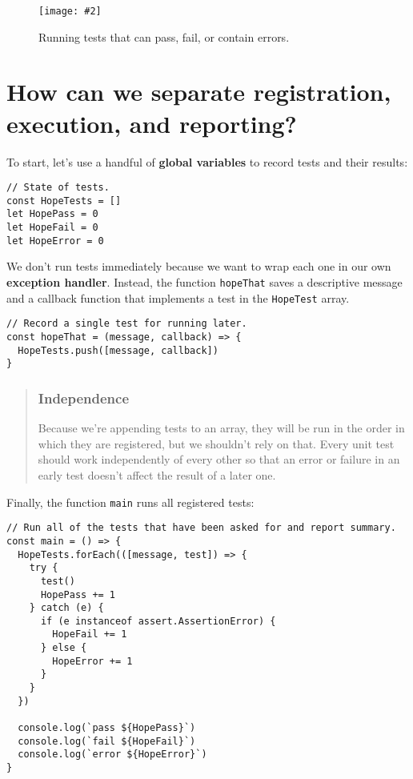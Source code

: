 \documentclass[krantzl]{krantz}
\newcommand{\figpdf}[4]{\begin{figure}%
\centering%
\texttt{[image: \#2]}%
\caption{#3}%
\label{#1}%
\end{figure}}
\newcommand{\glossref}[1]{\textbf{#1}}
\newenvironment{callout}{\savenotes\begin{tBox}\begin{quotation}\toggletrue{inbox}\renewcommand{\thempfootnote}{\arabic{footnote}}}{\end{quotation}\vspace{\baselineskip}\end{tBox}\togglefalse{inbox}\spewnotes}
\begin{document}
\figpdf{unit-test-mental-model}{./unit-test/mental-model.pdf}{Running tests that can pass, fail, or contain errors.}{0.6}

\section{How can we separate registration, execution, and reporting?}\label{unit-test-design}


To start,
let’s use a handful of \glossref{global variables} to record tests and their results:


\begin{lstlisting}[frame=tblr]
// State of tests.
const HopeTests = []
let HopePass = 0
let HopeFail = 0
let HopeError = 0
\end{lstlisting}



We don’t run tests immediately
because we want to wrap each one in our own \glossref{exception handler}.
Instead,
the function \texttt{hopeThat} saves a descriptive message and a callback function that implements a test
in the \texttt{HopeTest} array.


\begin{lstlisting}[frame=tblr]
// Record a single test for running later.
const hopeThat = (message, callback) => {
  HopeTests.push([message, callback])
}
\end{lstlisting}


\begin{callout}


\subsubsection*{Independence}


Because we’re appending tests to an array,
they will be run in the order in which they are registered,
but we shouldn’t rely on that.
Every unit test should work independently of every other
so that an error or failure in an early test
doesn’t affect the result of a later one.

\end{callout}


Finally,
the function \texttt{main} runs all registered tests:


\begin{lstlisting}[frame=tblr]
// Run all of the tests that have been asked for and report summary.
const main = () => {
  HopeTests.forEach(([message, test]) => {
    try {
      test()
      HopePass += 1
    } catch (e) {
      if (e instanceof assert.AssertionError) {
        HopeFail += 1
      } else {
        HopeError += 1
      }
    }
  })

  console.log(`pass ${HopePass}`)
  console.log(`fail ${HopeFail}`)
  console.log(`error ${HopeError}`)
}
\end{lstlisting}
\end{document}
